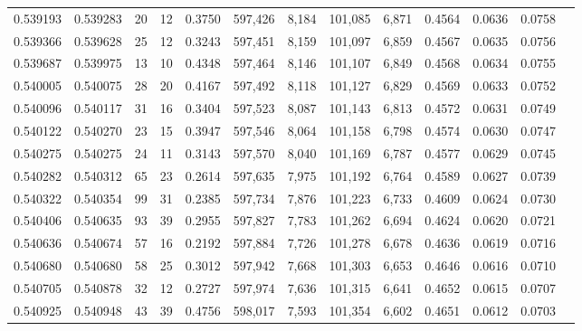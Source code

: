 \begin{tabular}{rrrrrrrrrrrrr}
0.539193 & 0.539283 &    20 &    12 &                                     0.3750 & 597,426 &   8,184 & 101,085 &   6,871 & 0.4564 & 0.0636 & 0.0758 \\
0.539366 & 0.539628 &    25 &    12 &                                     0.3243 & 597,451 &   8,159 & 101,097 &   6,859 & 0.4567 & 0.0635 & 0.0756 \\
0.539687 & 0.539975 &    13 &    10 &                                     0.4348 & 597,464 &   8,146 & 101,107 &   6,849 & 0.4568 & 0.0634 & 0.0755 \\
0.540005 & 0.540075 &    28 &    20 &                                     0.4167 & 597,492 &   8,118 & 101,127 &   6,829 & 0.4569 & 0.0633 & 0.0752 \\
0.540096 & 0.540117 &    31 &    16 &                                     0.3404 & 597,523 &   8,087 & 101,143 &   6,813 & 0.4572 & 0.0631 & 0.0749 \\
0.540122 & 0.540270 &    23 &    15 &                                     0.3947 & 597,546 &   8,064 & 101,158 &   6,798 & 0.4574 & 0.0630 & 0.0747 \\
0.540275 & 0.540275 &    24 &    11 &                                     0.3143 & 597,570 &   8,040 & 101,169 &   6,787 & 0.4577 & 0.0629 & 0.0745 \\
0.540282 & 0.540312 &    65 &    23 &                                     0.2614 & 597,635 &   7,975 & 101,192 &   6,764 & 0.4589 & 0.0627 & 0.0739 \\
0.540322 & 0.540354 &    99 &    31 &                                     0.2385 & 597,734 &   7,876 & 101,223 &   6,733 & 0.4609 & 0.0624 & 0.0730 \\
0.540406 & 0.540635 &    93 &    39 &                                     0.2955 & 597,827 &   7,783 & 101,262 &   6,694 & 0.4624 & 0.0620 & 0.0721 \\
0.540636 & 0.540674 &    57 &    16 &                                     0.2192 & 597,884 &   7,726 & 101,278 &   6,678 & 0.4636 & 0.0619 & 0.0716 \\
0.540680 & 0.540680 &    58 &    25 &                                     0.3012 & 597,942 &   7,668 & 101,303 &   6,653 & 0.4646 & 0.0616 & 0.0710 \\
0.540705 & 0.540878 &    32 &    12 &                                     0.2727 & 597,974 &   7,636 & 101,315 &   6,641 & 0.4652 & 0.0615 & 0.0707 \\
0.540925 & 0.540948 &    43 &    39 &                                     0.4756 & 598,017 &   7,593 & 101,354 &   6,602 & 0.4651 & 0.0612 & 0.0703 \\

\end{tabular}
